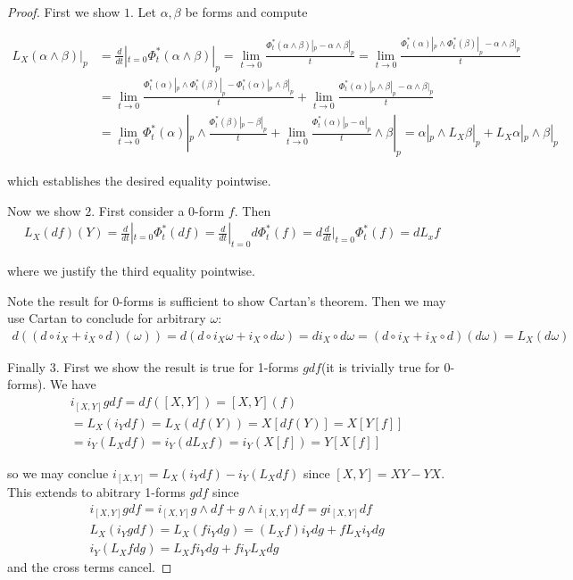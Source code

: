 \documentclass[11pt]{article}
\begin{document}
\begin{proof}
	First we show $1.$ Let $\alpha, \beta$ be forms and compute

	\begin{align*}
		L_X(\alpha \wedge \beta)|_p &= \frac{d}{dt}|_{t=0}\Phi^*_t (\alpha \wedge \beta)|_p = \lim_{t \to 0} \frac{\Phi^*_t(\alpha \wedge \beta)|_p - \alpha \wedge \beta|_p}{t} = \lim_{t \to 0} \frac{\Phi^*_t(\alpha)|_p \wedge \Phi^*_t(\beta)|_p - \alpha \wedge \beta|_p}{t} \\
		&= \lim_{t \to 0} \frac{\Phi^*_t(\alpha)|_p \wedge \Phi^*_t(\beta)|_p - \Phi^*_t(\alpha)|_p \wedge \beta |_p}{t} + \lim_{t \to 0}\frac{\Phi^*_t(\alpha)|_p \wedge \beta |_p - \alpha \wedge \beta |_p}{t} \\
		&= \lim_{t \to 0} \Phi^*_t(\alpha)|_p \wedge \frac{\Phi^*_t(\beta)|_p - \beta|_p}{t} + \lim_{t\to 0}\frac{\Phi^*_t(\alpha)|_p-\alpha |_p}{t}\wedge \beta|_p = \alpha|_p \wedge L_X \beta |_p + L_X \alpha |_p \wedge \beta|_p
	\end{align*}

	which establishes the desired equality pointwise.

	Now we show $2.$ First consider a 0-form $f$. Then
	\begin{align*}
		L_X(df)(Y) =  \frac{d}{dt}|_{t=0}\Phi^*_t(df) = \frac{d}{dt}|_{t=0}d \Phi^*_t(f) = d \frac{d}{dt}|_{t=0}\Phi^*_t(f) = dL_x f
	\end{align*}

	where we justify the third equality pointwise.%

	Note the result for 0-forms is sufficient to show Cartan's theorem. Then we may use Cartan to conclude for arbitrary $\omega$:
	\begin{align*}
		d((d\circ i_X + i_X \circ d)(\omega)) = d(d\circ i_X \omega + i_X \circ d \omega) = d i_X \circ d \omega = (d \circ i_X + i_X \circ d)(d \omega) = L_X (d\omega)
	\end{align*}

	Finally $3.$ First we show the result is true for 1-forms $gdf$(it is trivially true for 0-forms). We have
	\begin{align*}
		&i_{[X,Y]}gdf = df([X,Y]) = [X,Y](f) \\
		&= L_X(i_Y df) = L_X(df(Y)) = X[df(Y)] = X[Y[f]]\\
		&= i_Y(L_X df) = i_Y(dL_X f) = i_Y(X[f]) = Y[X[f]]
	\end{align*}

	so we may conclue $i_{[X,Y]} = L_X(i_Y df) - i_Y(L_X df)$ since $[X,Y] = XY - YX$. This extends to abitrary 1-forms $g df$ since
	\begin{align*}
		&i_{[X,Y]}g df = i_{[X,Y]} g \wedge df + g \wedge i_{[X,Y]} df = g i_{[X,Y]}df \\
		&L_X(i_Y gdf) = L_X(f i_Y dg) = (L_X f)i_Y dg + f L_Xi_Y dg\\
		& i_Y(L_X f dg) = L_X f i_Y dg + f i_Y L_X dg
	\end{align*}
	and the cross terms cancel.


\end{proof}
\end{document}
